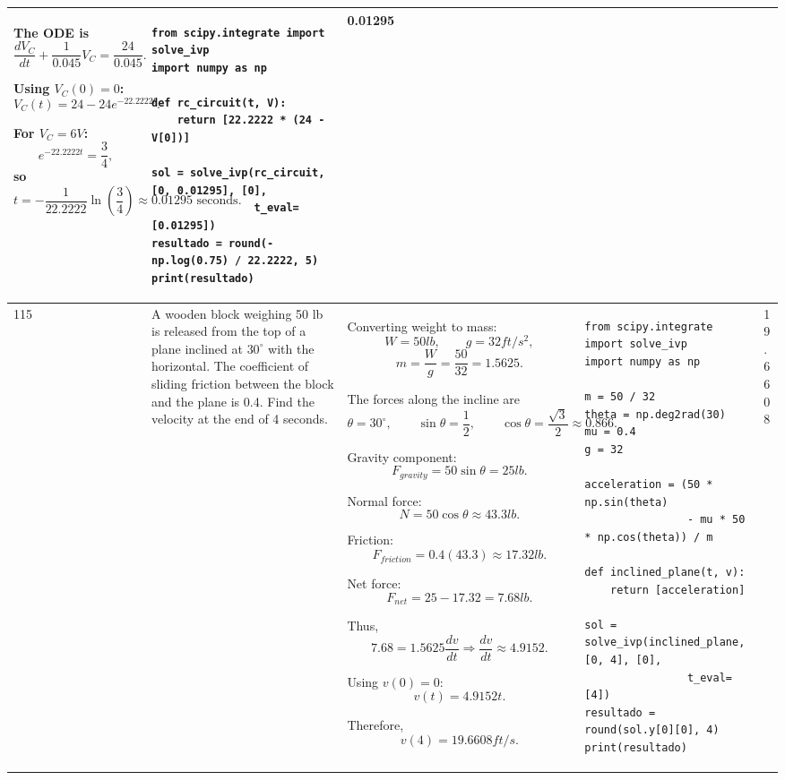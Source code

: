 \documentclass[a4paper,12pt]{article}
\begin{document}
\begin{longtable}{|p{0.3cm}|p{}|p{10cm}|p{}|p{1.5cm}|}
The ODE is
\[
\frac{dV_C}{dt}+\frac{1}{0.045}V_C
=\frac{24}{0.045}.
\]

Using \(V_C(0)=0\):
\[
V_C(t)=24-24e^{-22.2222t}.
\]

For \(V_C=6V\):
\[
e^{-22.2222t}=\frac34,
\]
so
\[
t=-\frac{1}{22.2222}\ln\left(\frac34\right)
\approx0.01295\text{ seconds}.
\] &
\begin{verbatim}
from scipy.integrate import solve_ivp
import numpy as np

def rc_circuit(t, V):
    return [22.2222 * (24 - V[0])]

sol = solve_ivp(rc_circuit, [0, 0.01295], [0],
                t_eval=[0.01295])
resultado = round(-np.log(0.75) / 22.2222, 5)
print(resultado)
\end{verbatim}
& 0.01295 \\ \hline

115 & A wooden block weighing 50 lb is released from the top of a plane inclined at $30^\circ$ with the horizontal. The coefficient of sliding friction between the block and the plane is 0.4. Find the velocity at the end of 4 seconds. &
Converting weight to mass:
\[
W=50lb,\qquad g=32ft/s^2,
\]
\[
m=\frac{W}{g}=\frac{50}{32}=1.5625.
\]

The forces along the incline are
\[
\theta=30^\circ,\qquad
\sin\theta=\frac12,\qquad
\cos\theta=\frac{\sqrt3}{2}\approx0.866.
\]

Gravity component:
\[
F_{gravity}=50\sin\theta=25lb.
\]

Normal force:
\[
N=50\cos\theta\approx43.3lb.
\]

Friction:
\[
F_{friction}=0.4(43.3)\approx17.32lb.
\]

Net force:
\[
F_{net}=25-17.32=7.68lb.
\]

Thus,
\[
7.68=1.5625\frac{dv}{dt}
\Rightarrow\frac{dv}{dt}\approx4.9152.
\]

Using \(v(0)=0\):
\[
v(t)=4.9152t.
\]

Therefore,
\[
v(4)=19.6608ft/s.
\] &
\begin{verbatim}
from scipy.integrate import solve_ivp
import numpy as np

m = 50 / 32
theta = np.deg2rad(30)
mu = 0.4
g = 32

acceleration = (50 * np.sin(theta)
                - mu * 50 * np.cos(theta)) / m

def inclined_plane(t, v):
    return [acceleration]

sol = solve_ivp(inclined_plane, [0, 4], [0],
                t_eval=[4])
resultado = round(sol.y[0][0], 4)
print(resultado)
\end{verbatim}
& 19.6608 \\ \hline


\end{longtable}
\end{document}
